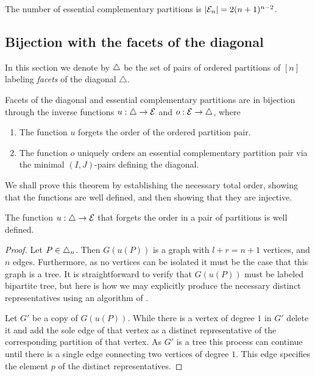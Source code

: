\begin{corollary}
The number of essential complementary partitions is $|\mathcal{E}_n| = 2(n+1)^{n-2}$.
\end{corollary}

\subsection{Bijection with the facets of the diagonal}

In this section we denote by $\triangle$ be the set of pairs of ordered partitions of $[n]$ labeling \emph{facets} of the diagonal $\triangle$.

\begin{thm}
\label{thm:facets}
Facets of the diagonal and essential complementary partitions are in bijection through the inverse functions $u:\triangle \to \mathcal{E}$ and $o:\mathcal{E}\to \triangle$, where
\begin{enumerate}
    \item The function $u$ forgets the order of the ordered partition pair.
    \item The function $o$ uniquely orders an essential complementary partition pair via the minimal $(I,J)$-pairs defining the diagonal. 
\end{enumerate}
\end{thm}
We shall prove this theorem by establishing the necessary total order, showing that the functions are well defined, and then showing that they are injective.

\begin{lemma} 
\label{l:u-well-defined}
The function $u:\triangle \to \mathcal{E}$ that forgets the order in a pair of partitions is well defined.
\end{lemma}
\begin{proof}
Let $P \in \triangle_n$. Then $G(u(P))$ is a graph with $l+r=n+1$ vertices, and $n$ edges. Furthermore, as no vertices can be isolated it must be the case that this graph is a tree. 
It is straightforward to verify that $G(u(P))$ must be labeled bipartite tree, but here is how we may explicitly produce the necessary distinct representatives using an algorithm of \cite[Theorem 2]{kajitani1982number}.

Let $G'$ be a copy of $G(u(P))$. 
While there is a vertex of degree $1$ in $G'$ delete it and add the sole edge of that vertex as a distinct representative of the corresponding partition of that vertex. 
As $G'$ is a tree this process can continue until there is a single edge connecting two vertices of degree $1$. 
This edge specifies the element $p$ of the distinct representatives.
\end{proof}

